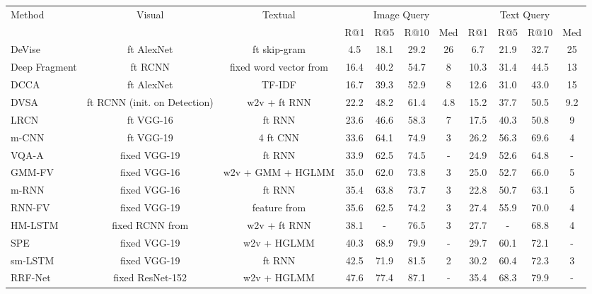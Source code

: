 \documentclass[10pt,final,journal]{IEEEtran}
\begin{document}
\setlength{\tabcolsep}{3.5pt}
\begin{table*}
\footnotesize
\begin{center}
\begin{tabular}{l|c|c|cccc|cccc}
\hline
\multirow{2}{*}{Method} & \multirow{2}{*}{Visual} & \multirow{2}{*}{Textual} & \multicolumn{4}{c|}{Image Query} & \multicolumn{4}{c}{Text Query}\\
   & & & R@1 & R@5 & R@10 & Med & R@1 & R@5 & R@10 & Med \\
\shline
DeVise \cite{frome2013devise} & ft AlexNet & ft skip-gram &4.5 & 18.1 & 29.2 & 26 & 6.7 & 21.9 & 32.7 & 25 \\
Deep Fragment \cite{karpathy2014deep} & ft RCNN & fixed word vector from \cite{huang2012improving} &16.4 & 40.2 & 54.7 & 8 & 10.3 & 31.4 & 44.5 & 13 \\
DCCA \cite{yan2015deep} & ft AlexNet  & TF-IDF &16.7 & 39.3 & 52.9 & 8 & 12.6 & 31.0 & 43.0 & 15 \\
DVSA \cite{karpathy2015deep} &  ft RCNN (init. on Detection) & w2v + ft RNN &22.2 & 48.2 & 61.4 & 4.8 & 15.2 & 37.7 & 50.5 & 9.2 \\
LRCN \cite{donahue2015long} & ft VGG-16  & ft RNN & 23.6 & 46.6 & 58.3 & 7 & 17.5 & 40.3 & 50.8 & 9 \\
m-CNN \cite{ma2015multimodal} & ft VGG-19 & 4  ft CNN &33.6 & 64.1 & 74.9 & 3 & 26.2 & 56.3 & 69.6 & 4\\
VQA-A \cite{lin2016leveraging} & fixed VGG-19 & ft RNN&33.9 & 62.5 & 74.5 & - & 24.9 & 52.6 & 64.8 & - \\
GMM-FV \cite{klein2015associating} &  fixed VGG-16 & w2v + GMM + HGLMM &35.0 & 62.0 & 73.8 & 3 & 25.0 & 52.7 & 66.0 & 5\\
m-RNN \cite{mao2014deep} & fixed VGG-16 & ft RNN &35.4 & 63.8 & 73.7 & 3 & 22.8 & 50.7 & 63.1 & 5 \\
RNN-FV \cite{lev2016rnn} &  fixed VGG-19 & feature from  \cite{klein2015associating} &35.6 & 62.5 & 74.2 & 3 & 27.4 & 55.9 & 70.0 & 4 \\
HM-LSTM \cite{niu2017hierarchical} & fixed RCNN from \cite{karpathy2015deep} & w2v + ft RNN &38.1 & - & 76.5 & 3 & 27.7 & - & 68.8 & 4 \\
SPE \cite{wang2016learning} &  fixed VGG-19 & w2v + HGLMM &40.3 & 68.9 & 79.9 & - & 29.7 & 60.1 & 72.1 & - \\
sm-LSTM \cite{huang2016instance} & fixed VGG-19 & ft RNN &42.5 & 71.9 & 81.5 & 2 & 30.2 & 60.4 & 72.3 & 3\\
RRF-Net \cite{liu2017learning} & fixed ResNet-152 & w2v + HGLMM &47.6 & 77.4 & 87.1 & - & 35.4 & 68.3 & 79.9 & - \\

\end{tabular}
\end{center}
\end{table*}
\end{document}
